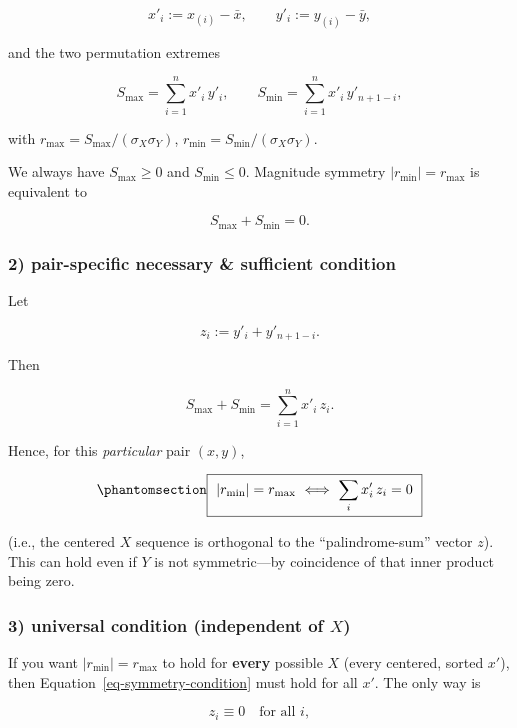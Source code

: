 \documentclass[
  12pt,
]{article}
\theoremstyle{plain}
\theoremstyle{definition}
\theoremstyle{remark}
\begin{document}
\[x'_i:=x_{(i)}-\bar x,\qquad y'_i:=y_{(i)}-\bar y,\]

and the two permutation extremes

\[S_{\max}=\sum_{i=1}^n x'_i\,y'_i,\qquad  
S_{\min}=\sum_{i=1}^n x'_i\,y'_{n+1-i},\]

with \(r_{\max}=S_{\max}/(\sigma_X\sigma_Y)\),
\(r_{\min}=S_{\min}/(\sigma_X\sigma_Y)\).

We always have \(S_{\max}\ge 0\) and \(S_{\min}\le 0\). Magnitude
symmetry \(|r_{\min}|=r_{\max}\) is equivalent to

\[S_{\max}+S_{\min}=0.\]

\subsubsection{\texorpdfstring{2) \textbf{pair-specific necessary \&
sufficient
condition}}{2) pair-specific necessary \& sufficient condition}}\label{pair-specific-necessary-sufficient-condition}

Let

\[z_i := y'_i + y'_{n+1-i}.\]

Then

\[S_{\max}+S_{\min}=\sum_{i=1}^n x'_i\,z_i.\]

Hence, for this \emph{particular} pair \((x,y)\),

\begin{equation}\phantomsection\label{eq-symmetry-condition}{\boxed{\ |r_{\min}|=r_{\max}\ \Longleftrightarrow\ \sum_i x'_i\,z_i=0\ }}\end{equation}

(i.e., the centered \(X\) sequence is orthogonal to the
``palindrome-sum'' vector \(z\)).\\
This can hold even if \(Y\) is not symmetric---by coincidence of that
inner product being zero.

\subsubsection{\texorpdfstring{3) \textbf{universal condition
(independent of
\(X\))}}{3) universal condition (independent of X)}}\label{universal-condition-independent-of-x}

If you want \(|r_{\min}|=r_{\max}\) to hold for \textbf{every} possible
\(X\) (every centered, sorted \(x'\)), then
Equation~\ref{eq-symmetry-condition} must hold for all \(x'\). The only
way is

\[z_i \equiv 0\quad\text{for all }i,\]
\end{document}
